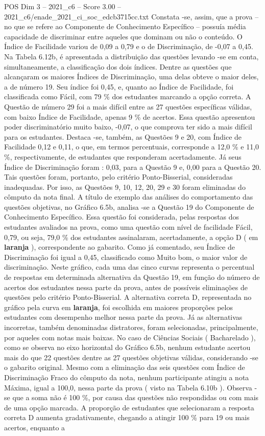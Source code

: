 \begin{textsample}{POS Dim 3 – 2021\_c6 – Score 3.00 – 2021\_c6/enade\_2021\_ci\_soc\_edcb3715cc.txt}
Constata -se, assim, que a prova – no que se refere ao Componente de Conhecimento Específico – possuía média capacidade de discriminar entre aqueles que dominam ou não o conteúdo.
O Índice de Facilidade variou de 0,09 a 0,79 e o de Discriminação, de -0,07 a 0,45.
Na Tabela 6.12b, é apresentada a distribuição das questões levando -se em conta, simultaneamente, a classificação dos dois índices.
Dentre as questões que alcançaram os maiores Índices de Discriminação, uma delas obteve o maior deles, a de número 19.
Seu índice foi 0,45, e, quanto ao Índice de Facilidade, foi classificada como Fácil, com 79 \% dos estudantes marcando a opção correta.
A Questão de número 29 foi a mais difícil entre as 27 questões específicas válidas, com baixo Índice de Facilidade, apenas 9 \% de acertos.
Essa questão apresentou poder discriminatório muito baixo, -0,07, o que comprova ter sido a mais difícil para os estudantes.
Destaca -se, também, as Questões 9 e 20, com Índice de Facilidade 0,12 e 0,11, o que, em termos percentuais, corresponde a 12,0 \% e 11,0 \%, respectivamente, de estudantes que responderam acertadamente.
Já seus Índice de Discriminação foram : 0,03, para a Questão 9 e, 0,00 para a Questão 20.
Tais questões foram, portanto, pelo critério Ponto-Bisserial, consideradas inadequadas.
Por isso, as Questões 9, 10, 12, 20, 29 e 30 foram eliminadas do cômputo da nota final.
A título de exemplo das análises do comportamento das questões objetivas, no Gráfico 6.5b, analisa -se a Questão 19 do Componente de Conhecimento Específico.
Essa questão foi considerada, pelas respostas dos estudantes avaliados na prova, como uma questão com nível de facilidade Fácil, 0,79, ou seja, 79,0 \% dos estudantes assinalaram, acertadamente, a opção D ( em \textbf{laranja} ), correspondente ao gabarito.
Como já comentado, seu Índice de Discriminação foi igual a 0,45, classificado como Muito bom, o maior valor de discriminação.
Neste gráfico, cada uma das cinco curvas representa o percentual de respostas em determinada alternativa da Questão 19, em função do número de acertos dos estudantes nessa parte da prova, antes de possíveis eliminações de questões pelo critério Ponto-Bisserial.
A alternativa correta D, representada no gráfico pela curva em \textbf{laranja}, foi escolhida em maiores proporções pelos estudantes com desempenho melhor nessa parte da prova.
Já as alternativas incorretas, também denominadas distratores, foram selecionadas, principalmente, por aqueles com notas mais baixas.
No caso de Ciências Sociais ( Bacharelado ), como se observa no eixo horizontal do Gráfico 6.5b, nenhum estudante acertou mais do que 22 questões dentre as 27 questões objetivas válidas, considerando -se o gabarito original.
Mesmo com a eliminação das seis questões com Índice de Discriminação Fraco do cômputo da nota, nenhum participante atingiu a nota Máxima, igual a 100,0, nessa parte da prova ( visto na Tabela 6.10b ).
Observa -se que a soma não é 100 \%, por causa das questões não respondidas ou com mais de uma opção marcada.
A proporção de estudantes que selecionaram a resposta correta D aumenta gradativamente, chegando a atingir 100 \% para 19 ou mais acertos, enquanto a

\end{textsample}

